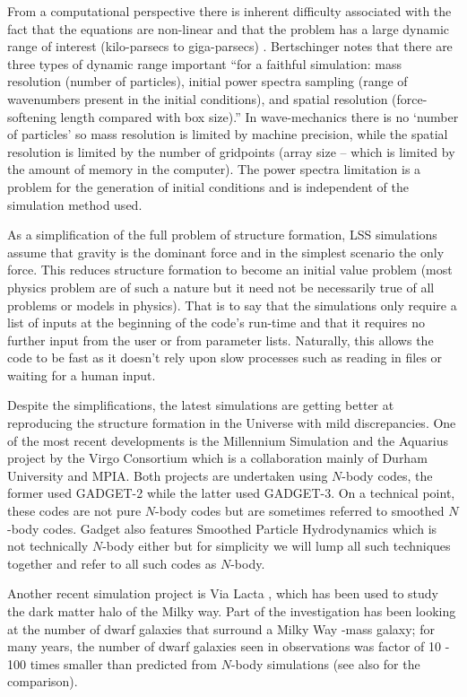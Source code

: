 From a computational perspective there is inherent difficulty associated with the fact that the equations are non-linear and that the problem has a large dynamic range of interest (kilo-parsecs to giga-parsecs) \citep{bib_hmpc}. Bertschinger \citep{bib_bert} notes that there are three types of dynamic range important ``for a faithful simulation: mass resolution (number of particles), initial power spectra sampling (range of wavenumbers present in the initial conditions), and spatial resolution (force-softening length compared with box size).'' In wave-mechanics there is no `number of particles' so mass resolution is limited by machine precision, while the spatial resolution is limited by the number of gridpoints (array size -- which is limited by the amount of memory in the computer). The power spectra limitation is a problem for the generation of initial conditions and is independent of the simulation method used.

As a simplification of the full problem of structure formation, LSS simulations assume that gravity is the dominant force and in the simplest scenario the only force. This reduces structure formation to become an initial value problem (most physics problem are of such a nature but it need not be necessarily true of all problems or models in physics). That is to say that the simulations only require a list of inputs at the beginning of the code's run-time and that it requires no further input from the user or from parameter lists. Naturally, this allows the code to be fast as it doesn't rely upon slow processes such as reading in files or waiting for a human input.

Despite the simplifications, the latest simulations are getting better at reproducing the structure formation in the Universe with mild discrepancies. One of the most recent developments is the Millennium Simulation \citep{bib_spr, bib_mil} and the Aquarius project \citep{bib_aqu} by the Virgo Consortium which is a collaboration mainly of Durham University and MPIA. Both projects are undertaken using $N$-body codes, the former used GADGET-2 while the latter used GADGET-3. On a technical point, these codes are not pure $N$-body codes but are sometimes referred to smoothed $N$-body codes. Gadget also features Smoothed Particle Hydrodynamics which is not technically $N$-body either but for simplicity we will lump all such techniques together and refer to all such codes as $N$-body.

Another recent simulation project is Via Lacta \citep{bib_via}, which has been used to study the dark matter halo of the Milky way. Part of the investigation has been looking at the number of dwarf galaxies that surround a Milky Way -mass galaxy; for many years, the number of dwarf galaxies seen in observations was factor of 10 - 100 times smaller than predicted from $N$-body simulations (see also \citep{bib_toll} for the comparison).

